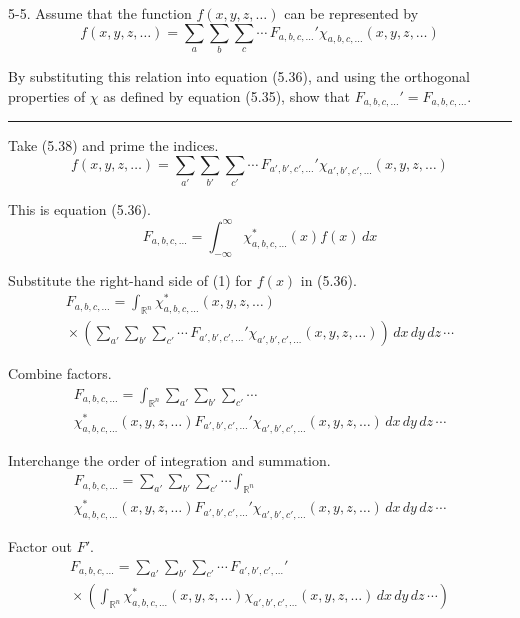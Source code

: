 \documentclass[12pt]{article}
\begin{document}
5-5.
Assume that the function $f(x,y,z,\ldots)$ can be represented by
\begin{equation*}
f(x,y,z,\ldots)=\sum_a\sum_b\sum_c\cdots\,F_{a,b,c,\ldots}'\chi_{a,b,c,\ldots}(x,y,z,\ldots)
\tag{5.38}
\end{equation*}

By substituting this relation into equation (5.36), and using the
orthogonal properties of $\chi$ as defined by equation (5.35),
show that $F_{a,b,c,\ldots}'=F_{a,b,c,\ldots}$.

\bigskip
\hrule

\bigskip
Take (5.38) and prime the indices.
\begin{equation*}
f(x,y,z,\ldots)=\sum_{a'}\sum_{b'}\sum_{c'}\cdots\,F_{a',b',c',\ldots}'\chi_{a',b',c',\ldots}(x,y,z,\ldots)
\tag{1}
\end{equation*}

This is equation (5.36).
\begin{equation*}
F_{a,b,c,\ldots}=\int_{-\infty}^\infty \chi_{a,b,c,\ldots}^*(x)f(x)\,dx
\tag{5.36}
\end{equation*}

Substitute the right-hand side of (1) for $f(x)$ in (5.36).
\begin{multline*}
F_{a,b,c,\ldots}
=\int_{\mathbb R^n}\chi_{a,b,c,\ldots}^*(x,y,z,\ldots)
\\
{}\times\left(\sum_{a'}\sum_{b'}\sum_{c'}\cdots\,F_{a',b',c',\ldots}'\chi_{a',b',c',\ldots}(x,y,z,\ldots)\right)
\,dx\,dy\,dz\,\cdots
\end{multline*}

Combine factors.
\begin{multline*}
F_{a,b,c,\ldots}
=\int_{\mathbb R^n}
\sum_{a'}\sum_{b'}\sum_{c'}\cdots
\\
\chi_{a,b,c,\ldots}^*(x,y,z,\ldots)
F_{a',b',c',\ldots}'
\chi_{a',b',c',\ldots}(x,y,z,\ldots)
\,dx\,dy\,dz\,\cdots
\end{multline*}

Interchange the order of integration and summation.
\begin{multline*}
F_{a,b,c,\ldots}
=\sum_{a'}\sum_{b'}\sum_{c'}\cdots\int_{\mathbb R^n}
\\
\chi_{a,b,c,\ldots}^*(x,y,z,\ldots)
F_{a',b',c',\ldots}'
\chi_{a',b',c',\ldots}(x,y,z,\ldots)
\,dx\,dy\,dz\,\cdots
\end{multline*}

Factor out $F'$.
\begin{multline*}
F_{a,b,c,\ldots}
=\sum_{a'}\sum_{b'}\sum_{c'}\cdots\,F_{a',b',c',\ldots}'
\\
{}\times\left(
\int_{\mathbb R^n}
\chi_{a,b,c,\ldots}^*(x,y,z,\ldots)
\chi_{a',b',c',\ldots}(x,y,z,\ldots)
\,dx\,dy\,dz\,\cdots
\right)
\end{multline*}
\end{document}
